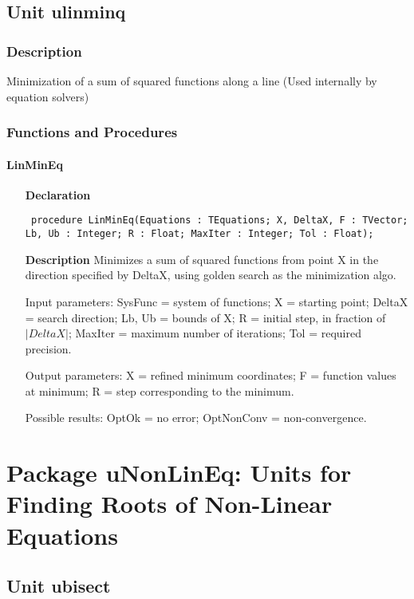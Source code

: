 \documentclass[12pt,a4paper,oneside]{report}
\newcommand{\declarationitem}[1]{\textbf{#1}}
\newcommand{\descriptiontitle}[1]{\textbf{#1}}
\newcommand{\code}[1]{\texttt{#1}}
\begin{document}
\section{Unit ulinminq}
\label{ulinminq}
\subsection{Description}
Minimization of a sum of squared functions along a line (Used internally by equation solvers) 
\subsection{Functions and Procedures}
\subsubsection{LinMinEq}
\label{ulinminq-LinMinEq}
\begin{itemize}\item[\declarationitem{Declaration}\hfill]
	\begin{flushleft}
		\code{
			procedure LinMinEq(Equations : TEquations; X, DeltaX, F : TVector; Lb, Ub : Integer; R : Float; MaxIter : Integer; Tol : Float);}
		
	\end{flushleft}
	
	\par
	\item[\descriptiontitle{Description}]
	Minimizes a sum of squared functions from point X in the direction specified by DeltaX, using golden search as the minimization algo.
	
	Input parameters: SysFunc = system of functions; X = starting point; DeltaX = search direction; Lb, Ub = bounds of X; R = initial step, in fraction of $|DeltaX|$; MaxIter = maximum number of iterations; Tol = required precision.
	
	Output parameters: X = refined minimum coordinates; F = function values at minimum; R = step corresponding to the minimum.
	
	Possible results: OptOk = no error; OptNonConv = non{-}convergence.
	
\end{itemize}
\chapter{Package uNonLinEq: Units for Finding Roots of Non-Linear Equations}\label{package-unonlineq}
\section{Unit ubisect}
\label{ubisect}
\end{document}
